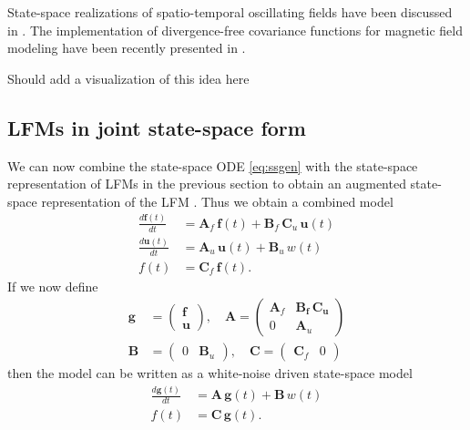 \documentclass[journal]{IEEEtran}
\newcommand{\simo}[1]{{\color{red}#1}}
\begin{document}
State-space realizations of spatio-temporal oscillating fields have been discussed in \cite{Solin+Sarkka:2013}. The implementation of divergence-free covariance functions for magnetic field modeling have been recently presented in \cite{Solin:2015}.

\simo{Should add a visualization of this idea here}

\subsection{LFMs in joint state-space form}
%
We can now combine the  state-space ODE \eqref{eq:ssgen} with the state-space representation of LFMs in the previous section to obtain an augmented state-space representation of the LFM \cite{Hartikainen+Sarkka:2011,Hartikainen+Seppanen+Sarkka:2012}. Thus we obtain a combined model
%
\begin{equation}
\begin{split}
  \frac{d\mathbf{f}(t)}{dt}
  &= \mathbf{A}_f \, \mathbf{f}(t)
  + \mathbf{B}_f \, \mathbf{C}_u \, \mathbf{u}(t) \\
  \frac{d\mathbf{u}(t)}{dt}
  &= \mathbf{A}_u \, \mathbf{u}(t) + \mathbf{B}_u \, w(t) \\
  f(t) &= \mathbf{C}_f \, \mathbf{f}(t).
\end{split}
\label{eq:comb}
\end{equation}
%
If we now define
%
\begin{equation}
\begin{split}
  \mathbf{g} &= \begin{pmatrix}
	\mathbf{f} \\ \mathbf{u}
  \end{pmatrix}, \quad
  \mathbf{A}
  = \begin{pmatrix}
	\mathbf{A}_f & \mathbf{\mathbf{B}_f \, \mathbf{C}_u} \\
	0 & \mathbf{A}_u
  \end{pmatrix} \\
  \mathbf{B}
  &= \begin{pmatrix}
	0 & \mathbf{B}_u
  \end{pmatrix}, \quad
  \mathbf{C}
  = \begin{pmatrix}
	\mathbf{C}_f & 0
  \end{pmatrix}
\end{split}
\label{eq:ssaugmats}
\end{equation}
%
then the model can be written as a white-noise driven state-space model
%
\begin{equation}
\begin{split}
  \frac{d\mathbf{g}(t)}{dt}
  &= \mathbf{A} \, \mathbf{g}(t)
  + \mathbf{B} \, w(t) \\
  f(t) &= \mathbf{C} \, \mathbf{g}(t).
\end{split}
\label{eq:ssaug}
\end{equation}
\end{document}
